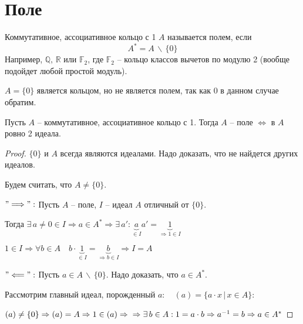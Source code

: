 
\section{Поле}
\begin{conj}
    Коммутативное, ассоциативное кольцо с 1 $A$ называется полем, если
    \[ A^* = A\, \backslash\, \{ 0 \} \]
    Например, $\mathbb{Q},\, \mathbb{R}$ или $\mathbb{F}_2$, 
    где $\mathbb{F}_2$ -- кольцо классов вычетов по модулю 2 
    (вообще подойдет любой простой модуль).
\end{conj}
\begin{notice}
    $A = \{ 0 \}$ является кольцом, но не является полем, так как 0 в данном случае обратим.
\end{notice}
\begin{theorem-non}
    Пусть $A$ -- коммутативное, ассоциативное кольцо с 1. Тогда $A$ -- поле $\Leftrightarrow$ в $A$ ровно 2 идеала.
\end{theorem-non}
\begin{proof} \quad 
  
    $\{ 0 \}$ и $A$ всегда являются идеалами. Надо доказать, что не найдется других идеалов.
  
    Будем считать, что $A \neq \{ 0 \}$. 
  
    $"\Longrightarrow":$ Пусть $A$ -- поле, $I$ -- идеал $A$ отличный от $\{ 0 \}$. 
    
    Тогда $\exists\, a \neq 0 \in I \Rightarrow a \in A^* \Rightarrow \exists\, a' : \underbrace{a}_{\in I}a' = \underbrace{1}_{\Rightarrow  1 \in I}$
    
    $1 \in I \Rightarrow \forall b \in A \quad b \cdot \underbrace{1}_{\in I} = \underbrace{b}_{\Rightarrow b \in I} \Rightarrow I = A$
  
    $"\Longleftarrow":$ Пусть $a \in A\, \backslash \, \{ 0 \} $. Надо доказать, что $a \in A^*$.
  
    Рассмотрим главный идеал, порожденный $a: \quad (a) = \{ a \cdot x\, |\, x \in A \} $:
  
    $(a) \neq \{  0 \} \Rightarrow (a) = A \Rightarrow 1 \in (a) \Rightarrow \\\\
    \Rightarrow \exists \, b \in A : 1 = a \cdot b \Rightarrow a^{-1} = b \Rightarrow a \in A^*$
\end{proof}
\vspace{0.7cm}
  
